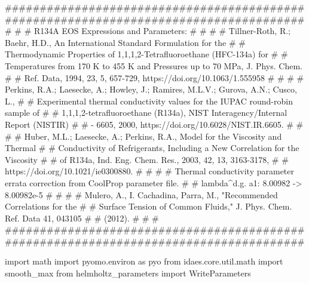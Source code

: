 \documentclass[oneside]{book}
\begin{document}
\begin{python}
######################################################################################
#                                                                                    #
# R134A EOS Expressions and Parameters:                                              #
#                                                                                    #
# Tillner-Roth, R.; Baehr, H.D., An International Standard Formulation for the       #
#    Thermodynamic Properties of 1,1,1,2-Tetrafluoroethane (HFC-134a) for            #
#    Temperatures from 170 K to 455 K and Pressures up to 70 MPa, J. Phys. Chem.     #
#    Ref. Data, 1994, 23, 5, 657-729, https://doi.org/10.1063/1.555958               #
#                                                                                    #
# Perkins, R.A.; Laesecke, A.; Howley, J.; Ramires, M.L.V.; Gurova, A.N.; Cusco, L., #
#    Experimental thermal conductivity values for the IUPAC round-robin sample of    #
#    1,1,1,2-tetrafluoroethane (R134a), NIST Interagency/Internal Report (NISTIR)    #
#    - 6605, 2000, https://doi.org/10.6028/NIST.IR.6605.                             #
#                                                                                    #
# Huber, M.L.; Laesecke, A.; Perkins, R.A., Model for the Viscosity and Thermal      #
#    Conductivity of Refrigerants, Including a New Correlation for the Viscosity     #
#    of R134a, Ind. Eng. Chem. Res., 2003, 42, 13, 3163-3178,                        #
#    https://doi.org/10.1021/ie0300880.                                              #
#                                                                                    #
# Thermal conductivity parameter errata correction from CoolProp parameter file.     #
# lambda^d.g. a1: 8.00982 -> 8.00982e-5                                              #
#                                                                                    #
# Mulero, A., I. Cachadina, Parra, M., "Recommended Correlations for the             #
#     Surface Tension of Common Fluids," J. Phys. Chem. Ref. Data 41, 043105         #
#     (2012).                                                                        #
#                                                                                    #
######################################################################################

import math
import pyomo.environ as pyo
from idaes.core.util.math import smooth_max
from helmholtz_parameters import WriteParameters



\end{python}
\end{document}
